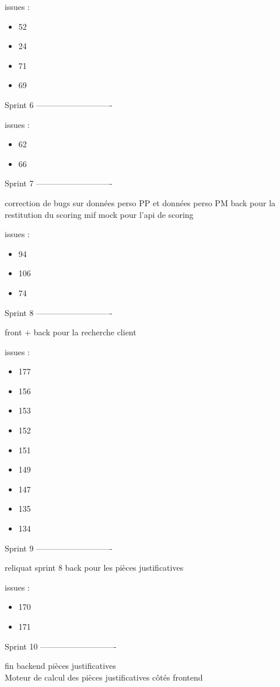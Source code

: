 issues :
\begin{itemize}
	\item 52
	\item 24
	\item 71
	\item 69
\end{itemize}	

Sprint 6 ----------------------------

issues :
\begin{itemize}
	\item 62
	\item 66
\end{itemize}

Sprint 7 ----------------------------

	correction de bugs sur données perso PP et données perso PM	
	back pour la restitution du scoring mif
	mock pour l'api de scoring
	
issues :
\begin{itemize}
	\item 94
	\item 106
	\item 74
\end{itemize}

Sprint 8 ----------------------------

front + back pour la recherche client

issues :
\begin{itemize}
	\item 177
	\item 156
	\item 153
	\item 152
	\item 151
	\item 149
	\item 147
	\item 135
	\item 134
\end{itemize}

Sprint 9 ----------------------------

reliquat sprint 8
back pour les pièces justificatives

issues :
\begin{itemize}
	\item 170
	\item 171
\end{itemize}

Sprint 10 ----------------------------
	
fin backend pièces justificatives \\
Moteur de calcul des pièces justificatives côtés frontend